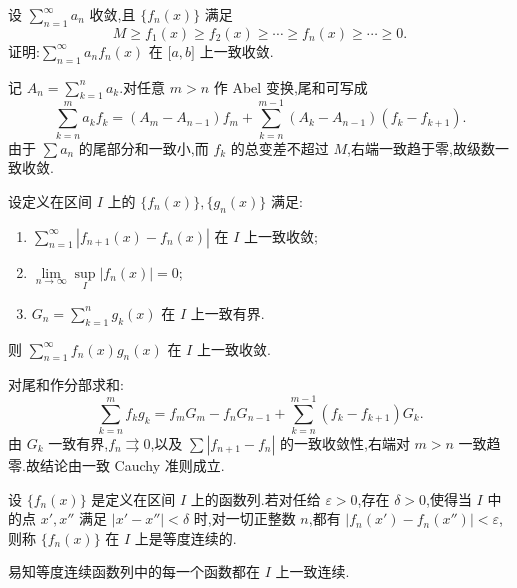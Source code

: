 \begin{example}
    设 $\displaystyle\sum\limits_{n=1}^{\infty}a_n$ 收敛,且 $\{f_n(x)\}$ 满足
    \[
        M\geq f_1(x)\geq f_2(x)\geq\cdots\geq f_n(x)\geq\cdots\geq0.
    \]
    证明:$\displaystyle\sum\limits_{n=1}^{\infty}a_nf_n(x)$ 在 $\lbrack a,b\rbrack$ 上一致收敛.
\end{example}
\exampleblank

\begin{solution}
    记 $A_n=\displaystyle\sum_{k=1}^{n}a_k$.对任意 $m>n$ 作 Abel 变换,尾和可写成
    \[
        \displaystyle\sum\limits_{k=n}^{m}a_kf_k
        =(A_m-A_{n-1})f_m+
        \sum\limits_{k=n}^{m-1}(A_k-A_{n-1})(f_k-f_{k+1}).
    \]
    由于 $\displaystyle\sum a_n$ 的尾部分和一致小,而 $f_k$ 的总变差不超过 $M$,右端一致趋于零,故级数一致收敛.
\end{solution}

\begin{example}
    设定义在区间 $I$ 上的 $\{f_n(x)\},\{g_n(x)\}$ 满足:
    \begin{enumerate}
        \item $\displaystyle\sum\limits_{n=1}^{\infty}|f_{n+1}(x)-f_n(x)|$ 在 $I$ 上一致收敛;
        \item $\displaystyle\lim\limits_{n\to\infty}\sup\limits_I|f_n(x)|=0$;
        \item $G_n=\displaystyle\sum\limits_{k=1}^n g_k(x)$ 在 $I$ 上一致有界.
    \end{enumerate}
    则 $\displaystyle\sum\limits_{n=1}^{\infty}f_n(x)g_n(x)$ 在 $I$ 上一致收敛.
\end{example}
\exampleblank

\begin{solution}
    对尾和作分部求和:
    \[
        \displaystyle\sum\limits_{k=n}^{m}f_kg_k
        =f_mG_m-f_nG_{n-1}
        +\sum\limits_{k=n}^{m-1}(f_k-f_{k+1})G_k.
    \]
    由 $G_k$ 一致有界,$f_n\rightrightarrows0$,以及
    $\displaystyle\sum|f_{n+1}-f_n|$ 的一致收敛性,右端对 $m>n$ 一致趋零.故结论由一致 Cauchy 准则成立.
\end{solution}

\begin{definition}
    设 $\{f_n(x)\}$ 是定义在区间 $I$ 上的函数列.若对任给 $\varepsilon>0$,存在 $\delta>0$,使得当 $I$ 中的点 $x',x''$ 满足 $|x'-x''|<\delta$ 时,对一切正整数 $n$,都有 $|f_n(x')-f_n(x'')|<\varepsilon$,则称 $\{f_n(x)\}$ 在 $I$ 上是等度连续的.
\end{definition}

\begin{remark}
    易知等度连续函数列中的每一个函数都在 $I$ 上一致连续.
\end{remark}

